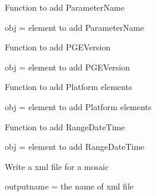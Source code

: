 \documentclass[a4paper,11pt,oneside]{sphinxmanual}
\begin{document}
\begin{fulllineitems}

\begin{fulllineitems}
\label{pymodis/pymodis:pymodis.parsemodis.parseModisMulti.valMeasuredParameter}
Function to add ParameterName

obj = element to add ParameterName

\end{fulllineitems}


\begin{fulllineitems}
\label{pymodis/pymodis:pymodis.parsemodis.parseModisMulti.valPGEVersion}
Function to add PGEVersion

obj = element to add PGEVersion

\end{fulllineitems}


\begin{fulllineitems}
\label{pymodis/pymodis:pymodis.parsemodis.parseModisMulti.valPlatform}
Function to add Platform elements

obj = element to add Platform elements

\end{fulllineitems}


\begin{fulllineitems}
\label{pymodis/pymodis:pymodis.parsemodis.parseModisMulti.valRangeTime}
Function to add RangeDateTime

obj = element to add RangeDateTime

\end{fulllineitems}


\begin{fulllineitems}
\label{pymodis/pymodis:pymodis.parsemodis.parseModisMulti.writexml}
Write a xml file for a mosaic

outputname = the name of xml file

\end{fulllineitems}


\end{fulllineitems}
\end{document}
